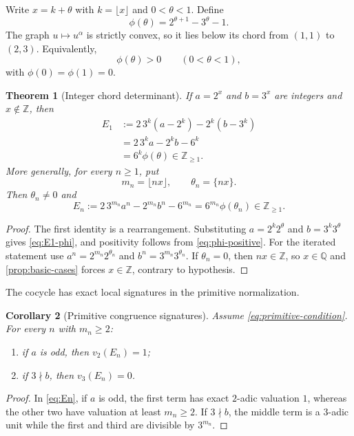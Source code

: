 \documentclass[11pt]{article}
\newtheorem{theorem}{Theorem}[section]
\newtheorem{corollary}[theorem]{Corollary}
\theoremstyle{definition}
\newcommand{\Z}{\mathbb Z}
\newcommand{\Q}{\mathbb Q}
\begin{document}
Write $x=k+\theta$ with $k=\lfloor x\rfloor$ and $0<\theta<1$.  Define
\[
 \phi(\theta)=2^{\theta+1}-3^\theta-1.
\]
The graph $u\mapsto u^\alpha$ is strictly convex, so it lies below its chord from $(1,1)$ to $(2,3)$.  Equivalently,
\begin{equation}\label{eq:phi-positive}
 \phi(\theta)>0\qquad(0<\theta<1),
\end{equation}
with $\phi(0)=\phi(1)=0$.

\begin{theorem}[Integer chord determinant]\label{thm:integer-cocycle}
If $a=2^x$ and $b=3^x$ are integers and $x\notin\Z$, then
\begin{align}
 E_1
 &:=2\,3^k(a-2^k)-2^k(b-3^k)\label{eq:E1-int}\\
 &=2\,3^ka-2^kb-6^k\label{eq:E1-expanded}\\
 &=6^k\phi(\theta)\in\Z_{\ge1}.\label{eq:E1-phi}
\end{align}
More generally, for every $n\ge1$, put
\[
 m_n=\lfloor nx\rfloor,\qquad \theta_n=\{nx\}.
\]
Then $\theta_n\ne0$ and
\begin{equation}\label{eq:En}
 E_n:=2\,3^{m_n}a^n-2^{m_n}b^n-6^{m_n}
 =6^{m_n}\phi(\theta_n)\in\Z_{\ge1}.
\end{equation}
\end{theorem}
\begin{proof}
The first identity is a rearrangement.  Substituting $a=2^k2^\theta$ and $b=3^k3^\theta$ gives \eqref{eq:E1-phi}, and positivity follows from \eqref{eq:phi-positive}.  For the iterated statement use $a^n=2^{m_n}2^{\theta_n}$ and $b^n=3^{m_n}3^{\theta_n}$.  If $\theta_n=0$, then $nx\in\Z$, so $x\in\Q$ and \cref{prop:basic-cases} forces $x\in\Z$, contrary to hypothesis.
\end{proof}

The cocycle has exact local signatures in the primitive normalization.

\begin{corollary}[Primitive congruence signatures]\label{cor:cocycle-valuations}
Assume \eqref{eq:primitive-condition}.  For every $n$ with $m_n\ge2$:
\begin{enumerate}[label=(\alph*)]
\item if $a$ is odd, then $v_2(E_n)=1$;
\item if $3\nmid b$, then $v_3(E_n)=0$.
\end{enumerate}
\end{corollary}
\begin{proof}
In \eqref{eq:En}, if $a$ is odd, the first term has exact $2$-adic valuation $1$, whereas the other two have valuation at least $m_n\ge2$.  If $3\nmid b$, the middle term is a $3$-adic unit while the first and third are divisible by $3^{m_n}$.
\end{proof}
\end{document}
